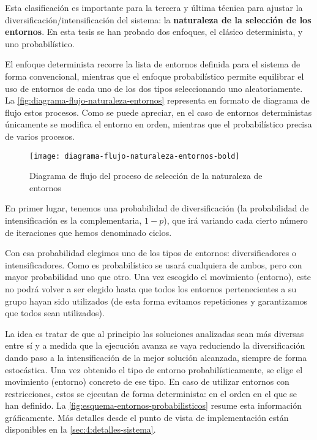 Esta clasificación es importante para la tercera y última técnica para ajustar la diversificación/intensificación del sistema: la \textbf{naturaleza de la selección de los entornos}. En esta tesis se han probado dos enfoques, el clásico determinista, y uno probabilístico.

El enfoque determinista recorre la lista de entornos definida para el sistema de forma convencional, mientras que el enfoque probabilístico permite equilibrar el uso de entornos de cada uno de los dos tipos seleccionando uno aleatoriamente. La \autoref{fig:diagrama-flujo-naturaleza-entornos} representa en formato de diagrama de flujo estos procesos. Como se puede apreciar, en el caso de entornos deterministas únicamente se modifica el entorno en orden, mientras que el probabilístico precisa de varios procesos.

\begin{figure}
    \centering    \texttt{[image: diagrama-flujo-naturaleza-entornos-bold]}
    \caption{Diagrama de flujo del proceso de selección de la naturaleza de entornos}
    \label{fig:diagrama-flujo-naturaleza-entornos}
\end{figure}

En primer lugar, tenemos una probabilidad de diversificación (la probabilidad de intensificación es la complementaria, $1-p$), que irá variando cada cierto número de iteraciones que hemos denominado ciclos.

Con esa probabilidad elegimos uno de los tipos de entornos: diversificadores o intensificadores. Como es probabilístico se usará cualquiera de ambos, pero con mayor probabilidad uno que otro. Una vez escogido el movimiento (entorno), este no podrá volver a ser elegido hasta que todos los entornos pertenecientes a su grupo hayan sido utilizados (de esta forma evitamos repeticiones y garantizamos que todos sean utilizados).

La idea es tratar de que al principio las soluciones analizadas sean más diversas entre sí y a medida que la ejecución avanza se vaya reduciendo la diversificación dando paso a la intensificación de la mejor solución alcanzada, siempre de forma estocástica. Una vez obtenido el tipo de entorno probabilísticamente, se elige el movimiento (entorno) concreto de ese tipo. En caso de utilizar entornos con restricciones, estos se ejecutan de forma determinista: en el orden en el que se han definido. La \autoref{fig:esquema-entornos-probabilisticos} resume esta información gráficamente. Más detalles desde el punto de vista de implementación están disponibles en la \autoref{sec:4:detalles-sistema}.

